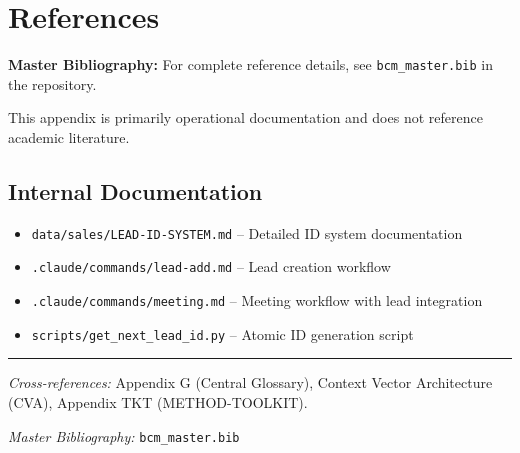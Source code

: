 \section{References}
\label{sec:bn-references}

\begin{tcolorbox}[colback=blue!5!white, colframe=blue!75!black]
\textbf{Master Bibliography:} For complete reference details, see
\texttt{bcm\_master.bib} in the repository.

This appendix is primarily operational documentation and does not reference academic literature.
\end{tcolorbox}

\subsection{Internal Documentation}

\begin{itemize}[nosep]
    \item \texttt{data/sales/LEAD-ID-SYSTEM.md} -- Detailed ID system documentation
    \item \texttt{.claude/commands/lead-add.md} -- Lead creation workflow
    \item \texttt{.claude/commands/meeting.md} -- Meeting workflow with lead integration
    \item \texttt{scripts/get\_next\_lead\_id.py} -- Atomic ID generation script
\end{itemize}

\nocite{bcm_master}


\vspace{1em}
\hrule
\vspace{0.5em}

\noindent\textit{Cross-references:}
Appendix G (Central Glossary),
Context Vector Architecture (CVA),
Appendix TKT (METHOD-TOOLKIT).

\noindent\textit{Master Bibliography:} \texttt{bcm\_master.bib}

